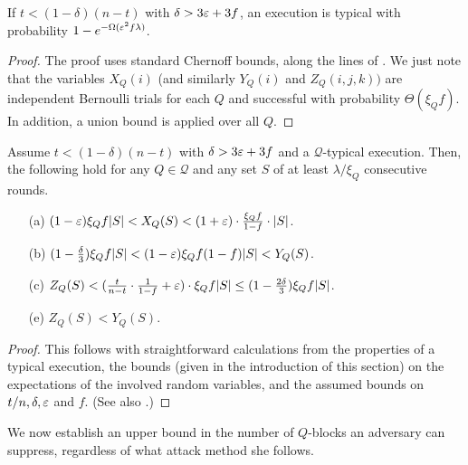 \begin{theorem}\label{theorem:alltypical}%
	If $t<(1-\delta)(n-t)$ with $\delta>3\varepsilon+3f$,
	an execution is typical with probability $1-e^{-\Omega(\varepsilon^2f\lambda)}$.
\end{theorem}
\begin{proof}
	The proof uses standard Chernoff bounds, along the lines of \cite{GKL15NEW}.
	We just note that the variables $X_Q(i)$ (and similarly $Y_Q(i)$ and
	$Z_Q(i,j,k))$ are independent Bernoulli trials for each $Q$ and successful
	with probability $\Theta(\xi_Qf)$. In addition, a union bound is applied
	over all $Q$.
\end{proof}%

\begin{lemma}\label{lemma:typical}%
	Assume $t<(1-\delta)(n-t)$ with $\delta>3\varepsilon+3f$ and a $\mathcal{Q}$-typical
	execution.
	Then, the following hold for any $Q\in\mathcal{Q}$ and any set $S$ of at least
	$\lambda/\xi_Q$ consecutive rounds.
	\begin{itemize}
	\item[(a)]
		$(1-\varepsilon)\xi_Qf|S|<X_Q(S)<(1+\varepsilon)\cdot\frac{\xi_Qf}{1-f}\cdot|S|$.
	\item[(b)]
			$(1-\frac\delta3)\xi_Qf|S|<(1-\varepsilon)\xi_Qf(1-f)|S|<Y_Q(S)$.
	\item[(c)]
		$Z_Q(S)<(\frac t{n-t}\cdot\frac1{1-f}+\varepsilon)\cdot\xi_Qf|S|
			\le(1-\frac{2\delta}3)\xi_Qf|S|$.
	\item[(e)] $Z_Q(S)<Y_Q(S)$.
	\end{itemize}
\end{lemma}
\begin{proof}
	This follows with straightforward calculations from the properties of
	a typical execution, the bounds (given in the introduction of this section)
	on the expectations of the involved random variables, and the assumed bounds
	on $t/n,\delta,\varepsilon$ and $f$. (See also \cite{GKL15NEW}.)
\end{proof}

We now establish an upper bound in the number of
$Q$-blocks an adversary can suppress, regardless of what attack method she
follows.

